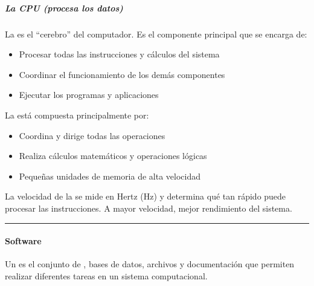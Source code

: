 \documentclass[letterpaper,10pt,spanish]{sphinxmanual}
\begin{document}
\subparagraph{La CPU (procesa los datos)}
\label{\detokenize{cursos/ofimatica11/recursos/T01:la-cpu-procesa-los-datos}}
\sphinxAtStartPar
La  es el “cerebro” del computador. Es el componente principal que se encarga de:
\begin{itemize}
\item {} 
\sphinxAtStartPar
Procesar todas las instrucciones y cálculos del sistema

\item {} 
\sphinxAtStartPar
Coordinar el funcionamiento de los demás componentes

\item {} 
\sphinxAtStartPar
Ejecutar los programas y aplicaciones

\end{itemize}

\sphinxAtStartPar
La  está compuesta principalmente por:
\begin{itemize}
\item {} 
\sphinxAtStartPar
{} Coordina y dirige todas las operaciones

\item {} 
\sphinxAtStartPar
{} Realiza cálculos matemáticos y operaciones lógicas

\item {} 
\sphinxAtStartPar
{} Pequeñas unidades de memoria de alta velocidad

\end{itemize}

\sphinxAtStartPar
La velocidad de la  se mide en Hertz (Hz) y determina qué tan rápido puede procesar las instrucciones. A mayor velocidad, mejor rendimiento del sistema.


\bigskip\hrule\bigskip



\paragraph{Software}
\label{\detokenize{cursos/ofimatica11/recursos/T01:software}}
\sphinxAtStartPar
\sphinxfootnotemark[2] Un  es el conjunto de , bases de datos, archivos y documentación que permiten realizar diferentes tareas en un sistema computacional.
\end{document}
